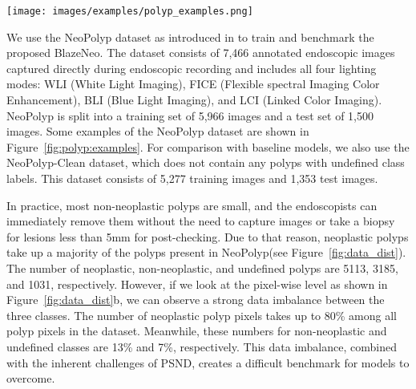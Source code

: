 \documentclass{ieeeaccess}
\newcommand{\ModelName}{BlazeNeo\xspace}
\newcommand{\DatasetName}{NeoPolyp\xspace}
\newcommand{\CleanDatasetName}{NeoPolyp-Clean\xspace}
\begin{document}
\begin{figure*}[ht!]
    \begin{center}
        \texttt{[image: images/examples/polyp\_examples.png]}
    \end{center}
    \caption{Some examples from the NeoPolyp dataset. The first row displays original images from the dataset. The second row shows the ground truths for polyp segmentation. The last row shows the ground truths for neoplasm segmentation, where some polyps are undefined and marked by yellow color. From left to right, the color modes are WLI, BLI, LCI, FICE, and FICE, respectively.}
    \label{fig:polyp:examples}
\end{figure*}

\begin{center}
    \begin{figure*}[ht!]
        \caption{Data distribution of polyp class labels in the \DatasetName dataset. In the pixel-wise distribution on the right, percentages are calculated on polyp pixels only (not including background pixels.)}
        \label{fig:data_dist}
    \end{figure*}
\end{center}

We use the \DatasetName dataset as introduced in \cite{lan2021neounet} to train and benchmark the proposed \ModelName{}. The dataset consists of 7,466 annotated endoscopic images captured directly during endoscopic recording and includes all four lighting modes: WLI (White Light Imaging), FICE (Flexible spectral Imaging Color Enhancement), BLI (Blue Light Imaging), and LCI (Linked Color Imaging). \DatasetName is split into a training set of 5,966 images and a test set of 1,500 images. Some examples of the \DatasetName dataset are shown in Figure~\ref{fig:polyp:examples}. For comparison with baseline models, we also use the \CleanDatasetName dataset, which does not contain any polyps with undefined class labels. This dataset consists of 5,277 training images and 1,353 test images.

In practice, most non-neoplastic polyps are small, and the endoscopists can immediately remove them without the need to capture images or take a biopsy for lesions less than 5mm for post-checking. Due to that reason, neoplastic polyps take up a majority of the polyps present in \DatasetName (see Figure~\ref{fig:data_dist}). The number of neoplastic, non-neoplastic, and undefined polyps are 5113, 3185, and 1031, respectively. However, if we look at the pixel-wise level as shown in Figure~\ref{fig:data_dist}b, we can observe a strong data imbalance between the three classes. The number of neoplastic polyp pixels takes up to 80\% among all polyp pixels in the dataset. Meanwhile, these numbers for non-neoplastic and undefined classes are 13\% and 7\%, respectively. This data imbalance, combined with the inherent challenges of PSND, creates a difficult benchmark for models to overcome.
\end{document}
